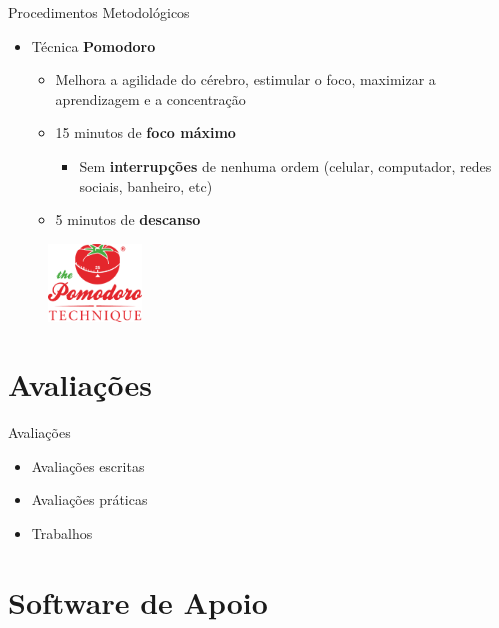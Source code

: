 \documentclass{beamer}
\begin{document}
\begin{frame}{Procedimentos Metodológicos}
    \begin{itemize}
        \item Técnica \textbf{Pomodoro}
        \begin{itemize}
            \item Melhora a agilidade do cérebro, estimular o foco, maximizar a aprendizagem e a concentração
            \item 15 minutos de \textbf{foco máximo}
            \begin{itemize}
                \item Sem \textbf{interrupções} de nenhuma ordem (celular, computador, redes sociais, banheiro, etc)
            \end{itemize}
            \item 5 minutos de \textbf{descanso}
        \end{itemize}
    \end{itemize}
    \begin{figure}
        \includegraphics[width=2.5cm]{Theme/Logos/pomodoro-technique.png}
    \end{figure}
\end{frame}

\section{Avaliações}

\begin{frame}{Avaliações}
    \begin{itemize}
        \item Avaliações escritas
        \item Avaliações práticas
        \item Trabalhos
    \end{itemize}
\end{frame}

\section{Software de Apoio}
\end{document}

